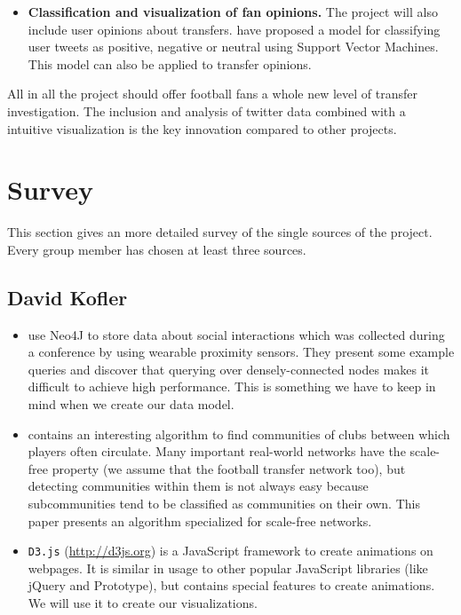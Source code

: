 \documentclass{article}
\begin{document}
\begin{itemize}
	\item \textbf{Classification and visualization of fan opinions.} The project will also include user opinions about transfers. \cite{Shrivatava2014} have proposed a model for classifying user tweets as positive, negative or neutral using Support Vector Machines. This model can also be applied to transfer opinions.
\end{itemize}

All in all the project should offer football fans a whole new level of transfer investigation. The inclusion and analysis of twitter data combined with a intuitive visualization is the key innovation compared to other projects.

\section{Survey}
This section gives an more detailed survey of the single sources of the project. Every group member has chosen at least three sources.
\subsection{David Kofler}

\begin{itemize}
	\item \cite{Cattuto:2013:TSN:2484425.2484442} use Neo4J to store data about social interactions which was collected during a conference by using wearable proximity sensors. They present some example queries and discover that querying over densely-connected nodes makes it difficult to achieve high performance. This is something we have to keep in mind when we create our data model.

	\item \cite{Jarukasemratana:2013:CDA:2481492.2481527} contains an interesting algorithm to find communities of clubs between which players often circulate. Many important real-world networks have the scale-free property (we assume that the football transfer network too), but detecting communities within them is not always easy because subcommunities tend to be classified as communities on their own. This paper presents an algorithm specialized for scale-free networks.

	\item \verb+D3.js+ (\url{http://d3js.org}) is a JavaScript framework to create animations on webpages. It is similar in usage to other popular JavaScript libraries (like jQuery and Prototype), but contains special features to create animations. We will use it to create our visualizations.
\end{itemize}
\end{document}
